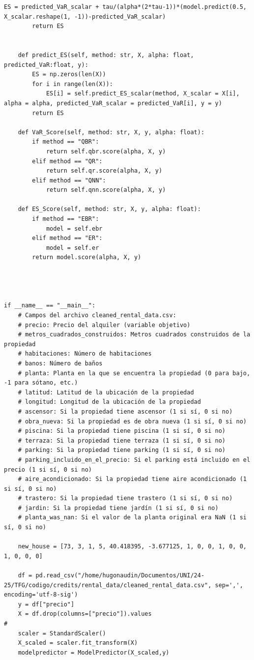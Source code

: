 \documentclass[11pt]{book}
\theoremstyle{plain} %
\theoremstyle{definition} %
\begin{document}
\begin{lstlisting}[style=pythonstyle, caption=main.py]
        ES = predicted_VaR_scalar + tau/(alpha*(2*tau-1))*(model.predict(0.5, X_scalar.reshape(1, -1))-predicted_VaR_scalar)
        return ES


    def predict_ES(self, method: str, X, alpha: float, predicted_VaR:float, y):
        ES = np.zeros(len(X))
        for i in range(len(X)): 
            ES[i] = self.predict_ES_scalar(method, X_scalar = X[i], alpha = alpha, predicted_VaR_scalar = predicted_VaR[i], y = y)
        return ES
    
    def VaR_Score(self, method: str, X, y, alpha: float):
        if method == "QBR":
            return self.qbr.score(alpha, X, y)
        elif method == "QR":
            return self.qr.score(alpha, X, y)
        elif method == "QNN":
            return self.qnn.score(alpha, X, y)
        
    def ES_Score(self, method: str, X, y, alpha: float):
        if method == "EBR":
            model = self.ebr
        elif method == "ER":
            model = self.er
        return model.score(alpha, X, y)

 


if __name__ == "__main__":
    # Campos del archivo cleaned_rental_data.csv:
    # precio: Precio del alquiler (variable objetivo)
    # metros_cuadrados_construidos: Metros cuadrados construidos de la propiedad
    # habitaciones: Número de habitaciones
    # banos: Número de baños
    # planta: Planta en la que se encuentra la propiedad (0 para bajo, -1 para sótano, etc.)
    # latitud: Latitud de la ubicación de la propiedad
    # longitud: Longitud de la ubicación de la propiedad
    # ascensor: Si la propiedad tiene ascensor (1 si sí, 0 si no)
    # obra_nueva: Si la propiedad es de obra nueva (1 si sí, 0 si no)
    # piscina: Si la propiedad tiene piscina (1 si sí, 0 si no)
    # terraza: Si la propiedad tiene terraza (1 si sí, 0 si no)
    # parking: Si la propiedad tiene parking (1 si sí, 0 si no)
    # parking_incluido_en_el_precio: Si el parking está incluido en el precio (1 si sí, 0 si no)
    # aire_acondicionado: Si la propiedad tiene aire acondicionado (1 si sí, 0 si no)
    # trastero: Si la propiedad tiene trastero (1 si sí, 0 si no)
    # jardin: Si la propiedad tiene jardín (1 si sí, 0 si no)
    # planta_was_nan: Si el valor de la planta original era NaN (1 si sí, 0 si no)

    new_house = [73, 3, 1, 5, 40.418395, -3.677125, 1, 0, 0, 1, 0, 0, 1, 0, 0, 0]

    df = pd.read_csv("/home/hugonaudin/Documentos/UNI/24-25/TFG/codigo/credits/rental_data/cleaned_rental_data.csv", sep=',', encoding='utf-8-sig')
    y = df["precio"]
    X = df.drop(columns=["precio"]).values
#
    scaler = StandardScaler()
    X_scaled = scaler.fit_transform(X)
    modelpredictor = ModelPredictor(X_scaled,y)


\end{lstlisting}
\end{document}
